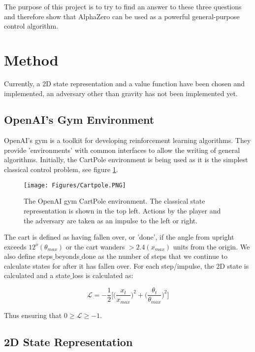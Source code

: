 \documentclass[a4paper]{article}
\newcommand{\loss}{\mathcal{L}}
\begin{document}
The purpose of this project is to try to find an answer to these three questions and therefore show that AlphaZero can be used as a powerful general-purpose control algorithm.

\section{Method}

Currently, a 2D state representation and a value function have been chosen and implemented, an adversary other than gravity has not been implemented yet.

\subsection{OpenAI's Gym Environment}

OpenAI's gym is a toolkit for developing reinforcement learning algorithms. They provide 'environments' with common interfaces to allow the writing of general algorithms. Initially, the CartPole environment is being used as it is the simplest classical control problem, see figure \ref{fig:cartpole}.

\begin{figure}[H]
   \centering
   \texttt{[image: Figures/Cartpole.PNG]}
   \caption{\label{fig:cartpole} The OpenAI gym CartPole environment. The classical state representation is shown in the top left. Actions by the player and the adversary are taken as an impulse to the left or right.}
\end{figure}

The cart is defined as having fallen over, or 'done', if the angle from upright exceeds $12^o (\theta_{max})$ or the cart wanders $> 2.4 (x_{max})$ units from the origin. We also define steps$\_$beyonds$\_$done as the number of steps that we continue to calculate states for after it has fallen over. For each step/impulse, the 2D state is calculated and a state$\_$loss is calculated as:

\begin{equation}
   \loss = - \frac{1}{2} \bigg[ \Big(\frac{x_t}{x_{max}}\Big)^2 + \Big(\frac{\theta_t}{\theta_{max}}\Big)^2 \bigg]
\end{equation}

Thus ensuring that $0 \geq \loss \geq -1$.

\subsection{2D State Representation}
\end{document}
